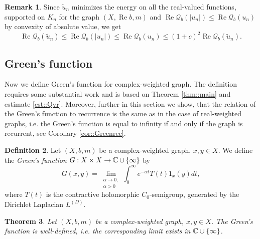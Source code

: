 \documentclass[a4paper,11pt]{amsart}
\newtheorem{theorem}{Theorem}[section]
\theoremstyle{definition}
\newtheorem{definition}[theorem]{Definition}
\newtheorem{remark}[theorem]{Remark}
\renewcommand{\Re}{\operatorname{Re}}%
\newcommand{\Q}{\mathcal{Q}}
\begin{document}
\begin{remark}
Since $\widetilde u_n$ minimizes the energy on all the real-valued  functions, supported on $K_n$ for the graph $(X,\Re b,m)$ and $ \Re \Q_b(|u_n|)\le  \Re \Q_b(u_n)$ by convexity of absolute value,  we get
$$
\Re  \Q_b(\widetilde u_n)\le \Re  \Q_b(|u_n|)\le\Re  \Q_b(u_n)\le(1+c)^2 \Re  \Q_b(\widetilde u_n).
$$
\end{remark}


\subsection{Green's function} Now we define Green's function for complex-weighted graph. The definition requires some substantial work and is based on Theorem \ref{thm::main} and estimate \eqref{est::Qvr}. Moreover, further in this section we show, that the relation of the Green's function to recurrence is the same as in the case of real-weighted graphs, i.e.  the Green's function is equal to infinity if and only if the graph is recurrent, see Corollary \ref{cor::Greenrec}.
\begin{definition}
Let $(X,b,m)$ be a complex-weighted graph, $x,y\in X$. We define the {\em Green's function} $G:X\times X\to\Bbb C\cup \{\infty\}$ by
$$
G(x,y)=\lim_{\substack{\alpha\to 0,\\\alpha>0}}\int_0^\infty e^{-\alpha t}T(t)1_x(y)dt,
$$
where $T(t)$ is the contractive holomorphic  $C_0$-semigroup, generated by the Dirichlet Laplacian $L^{(D)}$.
\end{definition}

\begin{theorem}
Let $(X,b,m)$ be a complex-weighted graph, $x,y\in X$.  The Green's function is well-defined, i.e. the corresponding limit exists in $\Bbb C\cup\{\infty\}$.

\end{theorem}
\end{document}
